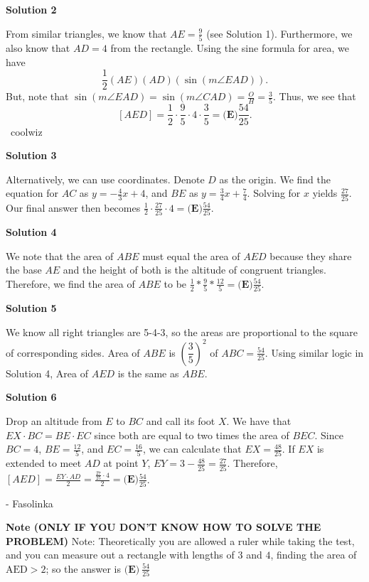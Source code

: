 \begin{enumerate}
\textbf{Solution 2}

From similar triangles, we know that $AE=\frac{9}{5}$ (see Solution 1). Furthermore, we also know that $AD=4$ from the rectangle. Using the sine formula for area, we have
 \[\frac{1}{2}(AE)(AD)(\sin(m\angle EAD)).\]But, note that $\sin(m\angle EAD)=\sin(m\angle CAD)=\frac{O}{H}=\frac{3}{5}$. Thus, we see that
 \[[AED]=\frac{1}{2}\cdot \frac{9}{5}\cdot 4\cdot\frac{3}{5}=\boxed{\textbf{(E)}\frac{54}{25}}.\]~coolwiz

 



\textbf{Solution 3}

Alternatively, we can use coordinates. Denote $D$ as the origin. We find the equation for $AC$ as $y=-\frac{4}{3}x+4$, and $BE$ as $y=\frac{3}{4}x+\frac{7}{4}$. Solving for $x$ yields $\frac{27}{25}$. Our final answer then becomes $\frac{1}{2}\cdot\frac{27}{25}\cdot4=\boxed{\textbf{(E)}\frac{54}{25}}.$




\textbf{Solution 4}

We note that the area of $ABE$ must equal the area of $AED$ because they share the base  $AE$ and the height of both is the altitude of congruent triangles. Therefore, we find the area of $ABE$ to be $\frac{1}{2}*\frac{9}{5}*\frac{12}{5}=\boxed{\textbf{(E)}\frac{54}{25}}.$




\textbf{Solution 5}

We know all right triangles are 5-4-3, so the areas are proportional to the square of corresponding sides. Area of $ABE$ is $(\dfrac{3}{5})^2$ of $ABC = \frac{54}{25}$. Using similar logic in Solution 4, Area of $AED$ is the same as $ABE$.

 



\textbf{Solution 6}

Drop an altitude from $E$ to $BC$ and call its foot $X$. We have that $EX \cdot BC=BE \cdot EC$ since both are equal to two times the area of $BEC$. Since $BC=4$, $BE=\frac{12}{5}$, and $EC=\frac{16}{5}$, we can calculate that $EX=\frac{48}{25}$. If $EX$ is extended to meet $AD$ at point $Y$, $EY=3-\frac{48}{25}=\frac{27}{25}$. Therefore, $[AED]=\frac{EY \cdot AD}{2}=\frac{\frac{27}{25} \cdot 4}{2}=\boxed{\textbf{(E)}\frac{54}{25}}$.

 - Fasolinka

 


 \textbf{Note (ONLY IF YOU DON'T KNOW HOW TO SOLVE THE PROBLEM)} Note: Theoretically you are allowed a ruler while taking the test, and you can measure out a rectangle with lengths of $3$ and $4$, finding the area of $\text{AED} > 2$; so the answer is $\boxed{\textbf{(E)}\ \frac{54}{25}}$




\end{enumerate}
